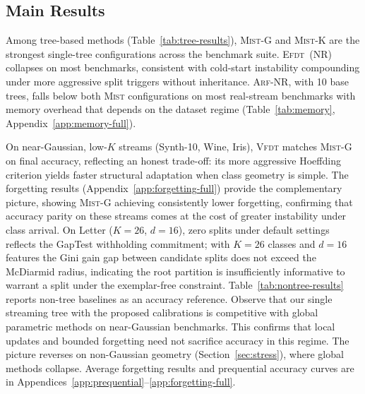 \documentclass{article}
\newcommand{\mist}{\textsc{Mist}}
\newcommand{\vfdt}{\textsc{Vfdt}}
\newcommand{\efdt}{\textsc{Efdt}}
\newcommand{\arf}{\textsc{Arf}}
\begin{document}
\subsection{Main Results}
\label{sec:results}
Among tree-based methods (Table~\ref{tab:tree-results}), \mist{}-G and
\mist{}-K are the strongest single-tree configurations across the benchmark
suite. \efdt{}~(NR) collapses on most benchmarks, consistent with
cold-start instability compounding under more aggressive split triggers
without inheritance. \arf{}-NR, with 10 base trees, falls below both
\mist{} configurations on most real-stream benchmarks 
with memory overhead that depends on the dataset regime
(Table~\ref{tab:memory}, Appendix~\ref{app:memory-full}).

On near-Gaussian, low-$K$ streams (Synth-10, Wine, Iris), \vfdt{} matches
\mist{}-G on final accuracy, reflecting an honest trade-off: its more
aggressive Hoeffding criterion yields faster structural adaptation when class
geometry is simple. The forgetting results (Appendix~\ref{app:forgetting-full})
provide the complementary picture, showing \mist{}-G achieving consistently lower
forgetting, confirming that accuracy parity on these streams comes at the
cost of greater instability under class arrival. 
On Letter ($K{=}26$, $d{=}16$), zero splits under default settings
reflects the GapTest withholding commitment; with $K{=}26$ classes
and $d{=}16$ features the Gini gain gap between candidate splits
does not exceed the McDiarmid radius, indicating the root partition
is insufficiently informative to warrant a split under the exemplar-free
constraint.
%
Table~\ref{tab:nontree-results} reports non-tree baselines as an accuracy
reference. Observe that our single streaming tree with the proposed calibrations is
competitive with global parametric methods on near-Gaussian benchmarks. This
confirms that local updates and bounded forgetting need not sacrifice
accuracy in this regime. The picture reverses on non-Gaussian geometry
(Section~\ref{sec:stress}), where global methods collapse. Average forgetting
results and prequential accuracy curves are in
Appendices~\ref{app:prequential}--\ref{app:forgetting-full}.
\end{document}
